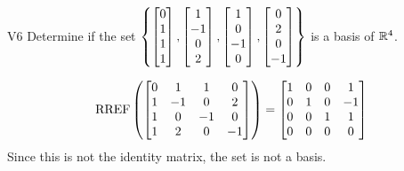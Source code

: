 \begin{problem}{V6}
Determine if the set \(\left\{ \begin{bmatrix} 0 \\ 1 \\ 1 \\ 1 \end{bmatrix}, \begin{bmatrix} 1 \\ -1 \\ 0 \\ 2 \end{bmatrix}, \begin{bmatrix} 1 \\ 0 \\ -1 \\ 0 \end{bmatrix}, \begin{bmatrix}0 \\ 2 \\ 0 \\ -1 \end{bmatrix} \right\}\) is a basis of \(\mathbb{R}^4\).
\end{problem}
\begin{solution}
\[\operatorname{RREF}\left(\begin{bmatrix} 0 & 1 & 1 & 0 \\ 1 & -1 & 0 & 2   \\ 1 & 0 & -1 & 0  \\ 1 & 2 & 0 & -1  \end{bmatrix} \right) = \begin{bmatrix} 1 & 0 & 0 & 1  \\ 0 & 1 & 0 & -1  \\ 0 & 0 & 1 & 1  \\ 0 & 0 & 0 & 0 \end{bmatrix}\]
Since this is not the identity matrix, the set is not a basis.
\end{solution}




